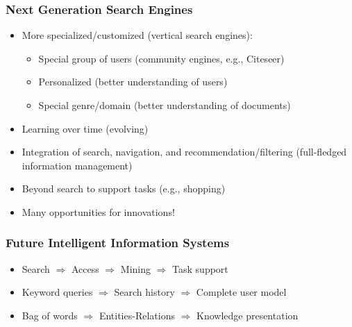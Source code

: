 \subsubsection{Next Generation Search Engines}
\begin{itemize}
\item More specialized/customized (vertical search engines):
\begin{itemize}
\item Special group of users (community engines, e.g., Citeseer) 
\item Personalized (better understanding of users)
\item Special genre/domain (better understanding of documents)
\end{itemize}

\item Learning over time (evolving)
\item Integration of search, navigation, and recommendation/filtering
(full-fledged information management)
\item Beyond search to support tasks (e.g., shopping)
\item Many opportunities for innovations!
\end{itemize}


\subsubsection{Future Intelligent Information Systems}
\begin{itemize}
\item Search $\Rightarrow$ Access $\Rightarrow$ Mining $\Rightarrow$ Task support
\item Keyword queries $\Rightarrow$ Search history $\Rightarrow$ Complete user model
\item Bag of words $\Rightarrow$ Entities-Relations $\Rightarrow$ Knowledge presentation
\end{itemize}












